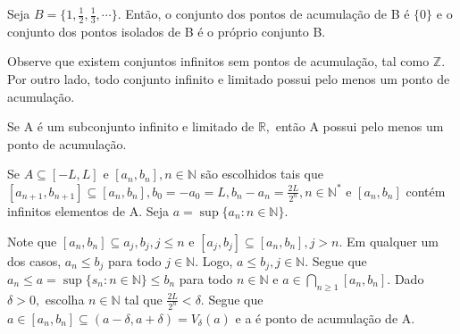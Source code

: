 \documentclass[analysis_notes.tex]{subfiles}
\begin{document}
\begin{example}
	Seja $B=\{1, \frac{1}{2}, \frac{1}{3}, \cdots\}$. Ent\~ao, o conjunto dos pontos de acumula\c c\~ao de B \'e $\{0\}$ e o conjunto dos pontos
	isolados de B \'e o pr\'oprio conjunto B.
\end{example}
Observe que existem conjuntos infinitos sem pontos de acumula\c c\~ao, tal como $\mathbb{Z}.$ Por outro lado, todo conjunto infinito e limitado possui
pelo menos um ponto de acumula\c c\~ao.
\begin{theorem*}
	Se A \'e um subconjunto infinito e limitado de $\mathbb{R},$ ent\~ao A possui pelo menos um ponto de acumula\c c\~ao.
\end{theorem*}
\begin{proof*}
	Se $A\subseteq{[-L, L]}$ e $[a_{n}, b_{n}], n\in \mathbb{N}$ s\~ao escolhidos tais que $[a_{n+1}, b_{n+1}]\subseteq{[a_{n}, b_{n}]}, b_{0} = -a_{0} = L,
		b_{n} - a_{n} = \frac{2L}{2^{n}}, n\in \mathbb{N}^*$ e $[a_{n}, b_{n}]$ cont\'em infinitos elementos de A. Seja $a = \sup{\{a_{n}: n\in \mathbb{N}\}}$.

	Note que $[a_{n}, b_{n}]\subseteq{a_{j}, b_{j}}, j\leq{n}$ e $[a_{j}, b_{j}]\subseteq{[a_{n}, b_{n}]}, j>n.$ Em qualquer um dos casos, $a_{n}\leq{b_{j}}$
	para todo $j\in \mathbb{N}$. Logo, $a \leq{b_{j}}, j\in \mathbb{N}.$ Segue que $a_{n}\leq{a=\sup \{s_{n}: n\in \mathbb{N}\}}\leq{b_{n}}$ para todo
	$n\in \mathbb{N}$ e $a\in\displaystyle\bigcap_{n\geq{1}}[a_{n}, b_{n}]$. Dado $\delta > 0,$ escolha $n\in \mathbb{N}$ tal que $\frac{2L}{2^{n}}<\delta.$ Segue
	que $a\in[a_{n}, b_{n}]\subseteq{(a-\delta, a+\delta) = V_{\delta}(a)}$ e a \'e ponto de acumula\c c\~ao de A. \qedsymbol
\end{proof*}
\newpage
\end{document}
